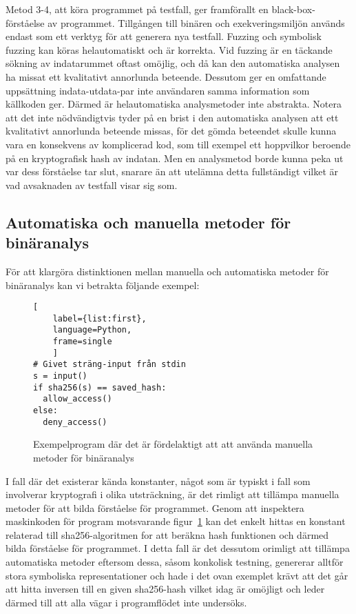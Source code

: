 Metod 3-4, att köra programmet på testfall, ger framförallt en
black-box-förståelse av programmet. Tillgången till binären och
exekveringsmiljön används endast som ett verktyg för att generera nya testfall.
Fuzzing och symbolisk fuzzing kan köras helautomatiskt och är korrekta.
Vid fuzzing är en täckande sökning av indatarummet oftast omöjlig, och då kan
den automatiska analysen ha missat ett kvalitativt annorlunda beteende. Dessutom
ger en omfattande uppsättning indata-utdata-par inte användaren samma
information som källkoden ger. Därmed är helautomatiska analysmetoder inte
abstrakta. Notera att det inte nödvändigtvis tyder på en brist i den
automatiska analysen att ett kvalitativt annorlunda beteende missas, för det
gömda beteendet skulle kunna vara en konsekvens av komplicerad kod, som till %
exempel ett hoppvilkor beroende på en kryptografisk hash av indatan. Men en
analysmetod borde kunna peka ut var dess förståelse tar slut, snarare än att
utelämna detta fullständigt vilket är vad avsaknaden av testfall visar sig som.


\subsection{Automatiska och manuella metoder för binäranalys}
För att klargöra distinktionen mellan manuella och automatiska metoder för
binäranalys kan vi betrakta följande exempel:

\begin{figure}
    \begin{lstlisting}[
    label={list:first},
    language=Python,
    frame=single
    ]
# Givet sträng-input från stdin
s = input()
if sha256(s) == saved_hash:
  allow_access()
else:
  deny_access()
\end{lstlisting}
    \caption{Exempelprogram där det är fördelaktigt att att använda manuella metoder för binäranalys}
    \label{fig:manual_method_example}
\end{figure}

I fall där det existerar kända konstanter, något som är typiskt i fall som
involverar kryptografi i olika utsträckning, är det rimligt att tillämpa
manuella metoder för att bilda förståelse för programmet. Genom att inspektera
maskinkoden för program motsvarande figur~\ref{fig:manual_method_example} kan
det enkelt hittas en konstant relaterad till sha256-algoritmen for att beräkna
hash funktionen och därmed bilda förståelse för programmet. I detta fall är det
dessutom orimligt att tillämpa automatiska metoder eftersom dessa, såsom
konkolisk testning, genererar alltför stora symboliska representationer och hade
i det ovan exemplet krävt att det går att hitta inversen till en given
sha256-hash vilket idag är omöjligt och leder därmed till att alla vägar i
programflödet inte undersöks.

